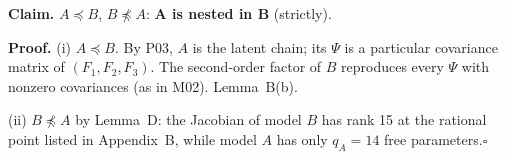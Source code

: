 \documentclass[10pt,a4paper]{article}
\newcommand{\nest}{\preceq}
\newcommand{\nnest}{\not\preceq}
\begin{document}
\par\bigskip
\noindent\textbf{Claim.} $A \nest B$, $B \nnest A$: \textbf{A is nested in B} (strictly).\par\smallskip
\noindent\textbf{Proof.} (i) $A\nest B$. By P03, $A$ is the latent chain; its $\Psi$ is a particular covariance matrix of $(F_1,F_2,F_3)$. The second-order factor of $B$ reproduces every $\Psi$ with nonzero covariances (as in M02). Lemma~B(b).\par\smallskip
\noindent(ii) $B\nnest A$ by Lemma~D: the Jacobian of model $B$ has rank 15 at the rational point listed in Appendix~B, while model $A$ has only $q_A=14$ free parameters.\hfill$\square$\par\medskip
{}

\clearpage
\end{document}
